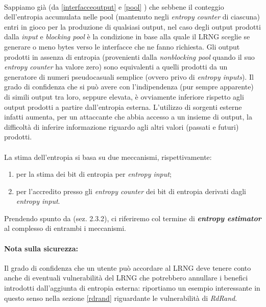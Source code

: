 \documentclass{article}
\begin{document}
\paragraph{} Sappiamo già (da \ref{interfacceoutput} e \ref{pool} ) che sebbene
il conteggio dell'entropia accumulata nelle pool (mantenuto negli
\emph{entropy counter} di ciascuna) entri in gioco per la produzione di
qualsiasi output, nel caso degli output prodotti dalla \emph{input} e
\emph{blocking pool} è la condizione in base alla quale il LRNG sceglie se
generare o meno bytes verso le interfacce che ne fanno richiesta. \newline Gli
output prodotti in assenza di entropia (provenienti dalla \emph{nonblocking
pool} quando il suo \emph{entropy counter} ha valore zero) sono equivalenti
a quelli prodotti da un generatore di numeri pseudocasuali semplice (ovvero
privo di \emph{entropy inputs}).
Il grado di confidenza che si può avere con l'indipendenza (pur sempre
apparente) di simili output tra loro, seppure elevata, è ovviamente inferiore
rispetto agli output prodotti a partire dall'entropia esterna.
L'utilizzo di sorgenti esterne infatti aumenta, per un attaccante
che abbia accesso a un insieme di output, la difficoltà di inferire informazione
riguardo agli altri valori (passati e futuri) prodotti.
\paragraph{} La stima dell'entropia si basa su due meccanismi, rispettivamente:
\begin{enumerate}
  \item per la stima dei bit di entropia per \emph{entropy input};
  \item per l'accredito presso gli \emph{entropy counter} dei bit di entropia 
  derivati dagli \emph{entropy input}.
\end{enumerate}
Prendendo spunto da \cite{lach} (sez. 2.3.2), ci riferiremo col termine di
\textbf{\emph{entropy estimator}} al complesso di entrambi i meccanismi.

\paragraph{Nota sulla sicurezza:} Il grado di confidenza che un utente può
accordare al LRNG deve tenere conto anche di eventuali vulnerabilità del LRNG
che potrebbero annullare i benefici introdotti dall'aggiunta di entropia
esterna: riportiamo un esempio interessante in questo senso nella sezione
\ref{rdrand} riguardante le vulnerabilità di \emph{RdRand}.
\end{document}
